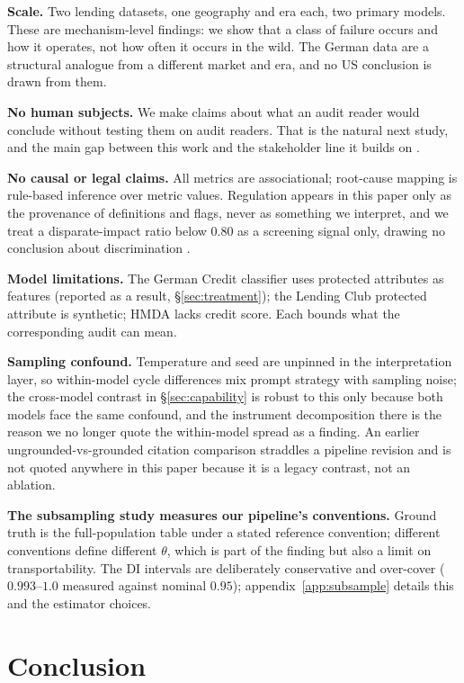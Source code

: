 \documentclass[sigconf,nonacm]{acmart}
\begin{document}
\textbf{Scale.} Two lending datasets, one geography and era each, two
primary models. These are mechanism-level findings: we show that a class of
failure occurs and how it operates, not how often it occurs in the wild. The
German data are a structural analogue from a different market and era, and no
US conclusion is drawn from them.

\textbf{No human subjects.} We make claims about what an audit reader would
conclude without testing them on audit readers. That is the natural next
study, and the main gap between this work and the stakeholder line it builds
on \citep{luo2025,luo2026b}.

\textbf{No causal or legal claims.} All metrics are associational; root-cause
mapping is rule-based inference over metric values. Regulation appears in this
paper only as the provenance of definitions and flags, never as something
we interpret, and we treat a disparate-impact ratio below $0.80$ as a
screening signal only, drawing no conclusion about discrimination
\citep{barocas2016,wachter2021}.

\textbf{Model limitations.} The German Credit classifier uses protected
attributes as features (reported as a result, \S\ref{sec:treatment}); the
Lending Club protected attribute is synthetic; HMDA lacks credit score. Each
bounds what the corresponding audit can mean.

\textbf{Sampling confound.} Temperature and seed are unpinned in the
interpretation layer, so within-model cycle differences mix prompt strategy
with sampling noise; the cross-model contrast in \S\ref{sec:capability} is
robust to this only because both models face the same confound, and the
instrument decomposition there is the reason we no longer quote the
within-model spread as a finding. An earlier ungrounded-vs-grounded citation
comparison straddles a pipeline revision and is not quoted anywhere in this
paper because it is a legacy contrast, not an ablation.

\textbf{The subsampling study measures our pipeline's conventions.} Ground
truth is the full-population table under a stated reference convention;
different conventions define different $\theta$, which is part of the finding
but also a limit on transportability. The DI intervals are deliberately
conservative and over-cover ($0.993$--$1.0$ measured against nominal $0.95$);
appendix~\ref{app:subsample} details this and the estimator choices.

\section{Conclusion}
\end{document}
